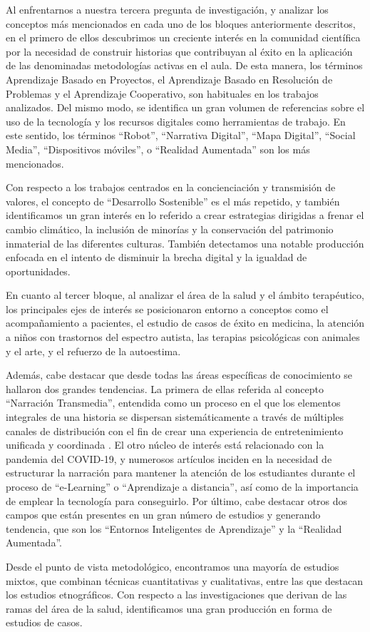 Al enfrentarnos a nuestra tercera pregunta de investigación, y analizar
los conceptos más mencionados en cada uno de los bloques anteriormente
descritos, en el primero de ellos descubrimos un creciente interés en la
comunidad científica por la necesidad de construir historias que
contribuyan al éxito en la aplicación de las denominadas metodologías
activas en el aula. De esta manera, los términos Aprendizaje Basado en
Proyectos, el Aprendizaje Basado en Resolución de Problemas y el
Aprendizaje Cooperativo, son habituales en los trabajos analizados. Del
mismo modo, se identifica un gran volumen de referencias sobre el uso de
la tecnología y los recursos digitales como herramientas de trabajo. En
este sentido, los términos \enquote{Robot}, \enquote{Narrativa Digital}, \enquote{Mapa Digital}, \enquote{Social Media}, \enquote{Dispositivos móviles}, o \enquote{Realidad Aumentada} son los más mencionados.

Con respecto a los trabajos centrados en la concienciación y transmisión
de valores, el concepto de \enquote{Desarrollo Sostenible} es el más repetido,
y también identificamos un gran interés en lo referido a crear
estrategias dirigidas a frenar el cambio climático, la inclusión de
minorías y la conservación del patrimonio inmaterial de las diferentes
culturas. También detectamos una notable producción enfocada en el
intento de disminuir la brecha digital y la igualdad de oportunidades.

En cuanto al tercer bloque, al analizar el área de la salud y el ámbito
terapéutico, los principales ejes de interés se posicionaron entorno a
conceptos como el acompañamiento a pacientes, el estudio de casos de
éxito en medicina, la atención a niños con trastornos del espectro
autista, las terapias psicológicas con animales y el arte, y el refuerzo
de la autoestima.

Además, cabe destacar que desde todas las áreas específicas de
conocimiento se hallaron dos grandes tendencias. La primera de ellas
referida al concepto \enquote{Narración Transmedia}, entendida como un
proceso en el que los elementos integrales de una historia se dispersan
sistemáticamente a través de múltiples canales de distribución con el
fin de crear una experiencia de entretenimiento unificada y coordinada
\cite{jenkins_transmedia_2010}. El otro núcleo de interés está relacionado con la pandemia del COVID-19, y numerosos artículos inciden en la necesidad de
estructurar la narración para mantener la atención de los estudiantes
durante el proceso de \enquote{e-Learning} o \enquote{Aprendizaje a distancia}, así como de la importancia de emplear la tecnología para conseguirlo. Por último, cabe destacar otros dos campos que están presentes en un gran número de estudios y generando tendencia, que son los \enquote{Entornos Inteligentes de Aprendizaje} y la \enquote{Realidad Aumentada}.

Desde el punto de vista metodológico, encontramos una mayoría de
estudios mixtos, que combinan técnicas cuantitativas y cualitativas,
entre las que destacan los estudios etnográficos. Con respecto a las
investigaciones que derivan de las ramas del área de la salud,
identificamos una gran producción en forma de estudios de casos.
